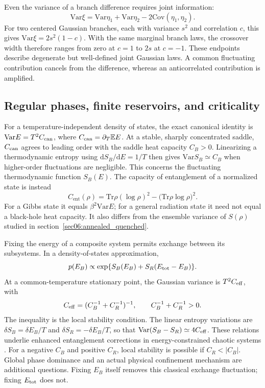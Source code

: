 \documentclass[11pt,letterpaper]{article}
\theoremstyle{plain}
\theoremstyle{definition}
\theoremstyle{remark}
\newcommand{\E}{\mathbb{E}}
\newcommand{\Var}{\text{Var}}
\newcommand{\Cov}{\text{Cov}}
\begin{document}
Even the variance of a branch difference requires joint information:
\begin{equation}
 \Var\xi=\Var\eta_1+\Var\eta_2-2\Cov(\eta_1,\eta_2).
 \label{eq04:covariance}
\end{equation}
For two centered Gaussian branches, each with variance $s^2$ and
correlation $c$, this gives $\Var\xi=2s^2(1-c)$. With the same marginal
branch laws, the crossover width therefore ranges from zero at $c=1$
to $2s$ at $c=-1$. These endpoints describe degenerate but well-defined
joint Gaussian laws. A common fluctuating contribution cancels from the
difference, whereas an anticorrelated contribution is amplified.

\subsection{Regular phases, finite reservoirs, and criticality}

For a temperature-independent density of states, the exact canonical
identity is $\Var E=T^2 C_{\rm can}$, where
$C_{\rm can}=\partial_T\E E$. At a stable, sharply concentrated saddle,
$C_{\rm can}$ agrees to leading order with the saddle heat capacity
$C_B>0$. Linearizing a thermodynamic entropy using
$\mathrm d S_B/\mathrm d E=1/T$ then gives $\Var S_B\simeq C_B$ when
higher-order fluctuations are negligible. This concerns the fluctuating
thermodynamic function $S_B(E)$. The capacity of entanglement of a
normalized state is instead
\begin{equation}
 C_{\mathrm{ent}}(\rho)
 =\mathrm{Tr}\rho(\log\rho)^2
   -\bigl(\mathrm{Tr}\rho\log\rho\bigr)^2.
 \label{eq04:entanglement_capacity}
\end{equation}
For a Gibbs state it equals $\beta^2\Var E$; for a general radiation
state it need not equal a black-hole heat capacity. It also differs
from the ensemble variance of $S(\rho)$ studied in
section~\ref{sec06:annealed_quenched}.

Fixing the energy of a composite system permits exchange between its
subsystems. In a density-of-states approximation,
\begin{equation}
 p(E_B)\propto
 \exp\{S_B(E_B)+S_R(E_{\rm tot}-E_B)\}.
 \label{eq04:finite_bath}
\end{equation}
At a common-temperature stationary point, the Gaussian variance is
$T^2 C_{\rm eff}$, with
\begin{equation}
 C_{\rm eff}=(C_B^{-1}+C_R^{-1})^{-1},\qquad
 C_B^{-1}+C_R^{-1}>0.
 \label{eq04:effective_capacity}
\end{equation}
The inequality is the local stability condition. The linear entropy
variations are $\delta S_B=\delta E_B/T$ and
$\delta S_R=-\delta E_B/T$, so that
$\Var(S_B-S_R)\simeq4C_{\rm eff}$.
These relations underlie enhanced entanglement corrections in
energy-constrained chaotic systems \cite{murthysrednicki2019}.
For a negative $C_B$ and positive $C_R$, local stability is possible if
$C_R<|C_B|$. Global phase dominance and an actual physical confinement
mechanism are additional questions. Fixing $E_B$ itself removes this
classical exchange fluctuation; fixing $E_{\rm tot}$ does not.
\end{document}
